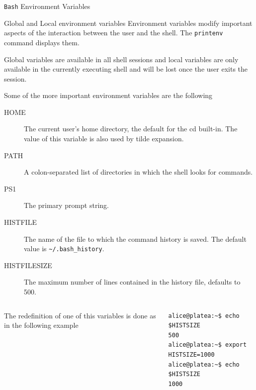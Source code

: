 \begin{frame}[t,fragile]{\texttt{Bash} Environment Variables}
\vspace{-0.25cm}  \begin{block}{\alert{Global} and \alert{Local} environment variables}
    {\footnotesize
      Environment variables modify important aspects of the interaction
  between the user and the shell. The \alert{\texttt{printenv}} command
  displays them.}

    {\scriptsize
  \alert{Global} variables are available in all shell sessions and \alert{local} variables are only available in the currently executing shell and will be lost once the user exits the session.

Some of the more important environment variables are the following
\begin{description}
\item[HOME] The current user's home directory, the default for the cd built-in. The value of this variable is also used by tilde expansion.
\item[PATH] A colon-separated list of directories in which the shell looks for commands.
\item[PS1] The primary prompt string.
\item[HISTFILE] The name of the file to which the command history is
  saved. The default value is \texttt{\textasciitilde/.bash\_history}.
\item[HISTFILESIZE] The maximum number of lines contained in the history file, defaults to 500.
\end{description}
}
{\tiny
  \begin{columns}
      The redefinition of one of this variables is done as in
  the following example
        \hspace{-3cm}
        \begin{lstlisting}
alice@platea:~$ echo $HISTSIZE
500
alice@platea:~$ export HISTSIZE=1000
alice@platea:~$ echo $HISTSIZE
1000
       \end{lstlisting}%
    \end{columns}
  }
  \end{block}
  
\end{frame}
